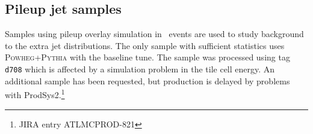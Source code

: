 



\subsection{Pileup jet samples}
Samples using pileup overlay simulation in \ttbar\ events are used to study background to the extra jet distributions. The only sample with sufficient statistics uses \textsc{  Powheg+Pythia} with the baseline tune. The sample was processed using tag \texttt{ d708} which is affected by a simulation problem in the tile cell energy. An additional sample has been requested, but production is delayed by problems with ProdSys2.\footnote{JIRA entry \textsc{  ATLMCPROD-821}} 

